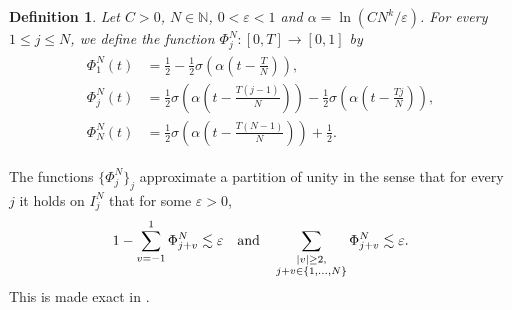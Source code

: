 \documentclass{article}
\numberwithin{equation}{section}
\newcommand{\R}{\mathbb{R}}
\newcommand{\N}{\mathbb{N}}
\renewcommand{\epsilon}{\varepsilon}
\newcommand{\1}{\mathbbm{1}}
\newcommand{\ghat}{\widehat{g}}
\newcommand{\fhat}{\widehat{f}}
\newcommand{\yhat}{\widehat{y}}
\newcommand{\him}{h_{i,m}}
\newtheorem{definition}[theorem]{Definition}
\newtheorem{lemma}[theorem]{Lemma}
\begin{document}





\begin{definition}\label{def:pou}
Let $C>0$, $N\in\N$, $0<\epsilon<1$ and $\alpha=\ln(CN^k/\epsilon)$. For every $1\leq j\leq N$, we define the function $\Phi_j^N:[0,T]\to[0,1]$ by
\begin{align}\label{eq:pou-def}
\begin{split}
    \Phi_1^N(t) &= \frac{1}{2}-\frac{1}{2}\sigma\left(\alpha\left(t-\frac{T}{N}\right)\right),\\
    \Phi_j^N(t) &= \frac{1}{2}\sigma\left(\alpha\left(t-\frac{T(j-1)}{N}\right)\right) - \frac{1}{2}\sigma\left(\alpha\left(t-\frac{Tj}{N}\right)\right),\\
    \Phi_N^N(t) &= \frac{1}{2}\sigma\left(\alpha\left(t-\frac{T(N-1)}{N}\right)\right)+\frac{1}{2}.
    \end{split}
\end{align}
\end{definition}
The functions $\{\Phi^{N}_j\}_j$ approximate a partition of unity in the sense that for every $j$ it holds on $I_j^N$ that for some $\epsilon>0$,
\begin{equation}
    1-\sum_{v=-1}^1\Phi^{N}_{j+v} \lesssim \epsilon \quad \text{and} \quad \sum_{\substack{\abs{v}\geq 2,\\ j+v \in \{1,\ldots, N\}}}\Phi^{N}_{j+v} \lesssim \epsilon.
\end{equation}
This is made exact in \cite[Section 4]{deryck2021approximation}. 
\end{document}
